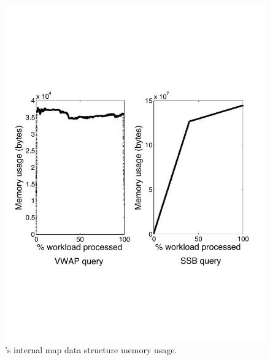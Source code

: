 \begin{figure}[h]
\begin{center}
\includegraphics[scale=0.44]{../plots/mem_usage.pdf}
\end{center}
\vspace{-4mm}
\caption{\compiler's internal map data structure memory usage.}
\label{fig:memusage}
\end{figure}


